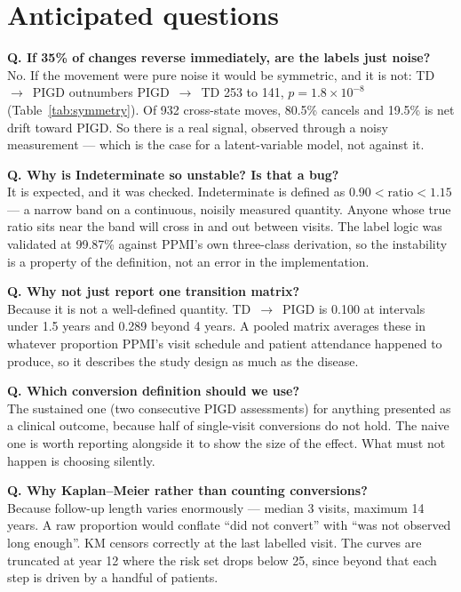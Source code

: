 \documentclass[11pt,a4paper]{article}
\newcommand{\arr}{$\rightarrow$}
\begin{document}
\section{Anticipated questions}

\noindent\textbf{Q. If 35\% of changes reverse immediately, are the labels just noise?}\\
No. If the movement were pure noise it would be symmetric, and it is not:
TD~\arr~PIGD outnumbers PIGD~\arr~TD 253 to 141, $p = 1.8\times10^{-8}$
(Table~\ref{tab:symmetry}). Of 932 cross-state moves, 80.5\% cancels and 19.5\%
is net drift toward PIGD. So there is a real signal, observed through a noisy
measurement --- which is the case for a latent-variable model, not against it.

\medskip
\noindent\textbf{Q. Why is Indeterminate so unstable? Is that a bug?}\\
It is expected, and it was checked. Indeterminate is defined as
$0.90 < \text{ratio} < 1.15$ --- a narrow band on a continuous, noisily measured
quantity. Anyone whose true ratio sits near the band will cross in and out
between visits. The label logic was validated at 99.87\% against PPMI's own
three-class derivation, so the instability is a property of the definition, not
an error in the implementation.

\medskip
\noindent\textbf{Q. Why not just report one transition matrix?}\\
Because it is not a well-defined quantity. TD~\arr~PIGD is 0.100 at intervals
under 1.5 years and 0.289 beyond 4 years. A pooled matrix averages these in
whatever proportion PPMI's visit schedule and patient attendance happened to
produce, so it describes the study design as much as the disease.

\medskip
\noindent\textbf{Q. Which conversion definition should we use?}\\
The sustained one (two consecutive PIGD assessments) for anything presented as
a clinical outcome, because half of single-visit conversions do not hold. The
naive one is worth reporting alongside it to show the size of the effect. What
must not happen is choosing silently.

\medskip
\noindent\textbf{Q. Why Kaplan--Meier rather than counting conversions?}\\
Because follow-up length varies enormously --- median 3 visits, maximum 14
years. A raw proportion would conflate ``did not convert'' with ``was not
observed long enough''. KM censors correctly at the last labelled visit. The
curves are truncated at year 12 where the risk set drops below 25, since beyond
that each step is driven by a handful of patients.
\end{document}
